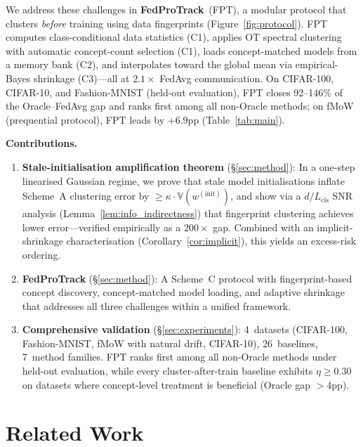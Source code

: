 \documentclass[11pt]{article}
\newcommand{\V}{\mathbb{V}}
\begin{document}
We address these challenges in \textbf{FedProTrack}~(FPT), a modular protocol that clusters \emph{before} training using data fingerprints (Figure~\ref{fig:protocol}).
FPT computes class-conditional data statistics (C1), applies OT spectral clustering with automatic concept-count selection (C1), loads concept-matched models from a memory bank (C2), and interpolates toward the global mean via empirical-Bayes shrinkage (C3)---all at $2.1\times$ FedAvg communication.
On CIFAR-100, CIFAR-10, and Fashion-MNIST (held-out evaluation), FPT closes 92--146\% of the Oracle--FedAvg gap and ranks first among all non-Oracle methods; on fMoW (prequential protocol), FPT leads by $+6.9$pp (Table~\ref{tab:main}).

\textbf{Contributions.}
\begin{enumerate}[leftmargin=*,topsep=2pt,itemsep=1pt]
    \item \textbf{Stale-initialisation amplification theorem} (\S\ref{sec:method}): In a one-step linearised Gaussian regime, we prove that stale model initialisations inflate Scheme~A clustering error by $\ge \kappa \cdot \V(w^{(\mathrm{init})})$, and show via a $d/L_{\mathrm{cls}}$ SNR analysis (Lemma~\ref{lem:info_indirectness}) that fingerprint clustering achieves lower error---verified empirically as a $200\times$ gap.
    Combined with an implicit-shrinkage characterisation (Corollary~\ref{cor:implicit}), this yields an excess-risk ordering.

    \item \textbf{FedProTrack} (\S\ref{sec:method}): A Scheme~C protocol with fingerprint-based concept discovery, concept-matched model loading, and adaptive shrinkage that addresses all three challenges within a unified framework.

    \item \textbf{Comprehensive validation} (\S\ref{sec:experiments}): 4~datasets (CIFAR-100, Fashion-MNIST, fMoW with natural drift, CIFAR-10), 26~baselines, 7~method families.
    FPT ranks first among all non-Oracle methods under held-out evaluation, while every cluster-after-train baseline exhibits $\eta \ge 0.30$ on datasets where concept-level treatment is beneficial (Oracle gap $> 4$pp).
\end{enumerate}


\section{Related Work}
\label{sec:related}
\end{document}
